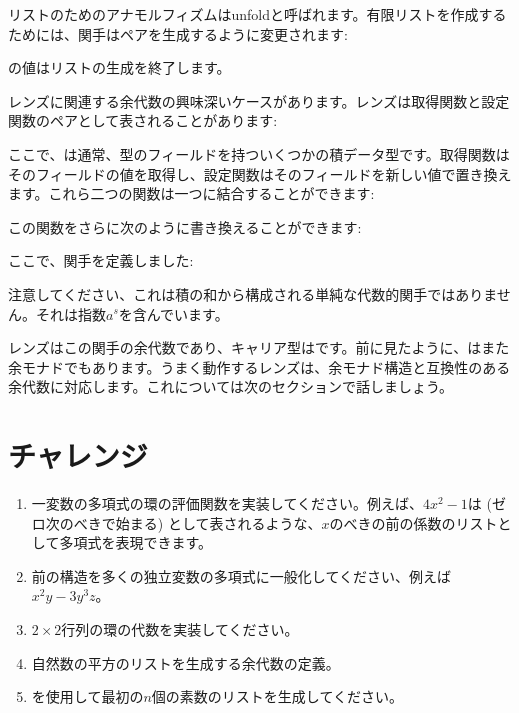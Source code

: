 リストのためのアナモルフィズムはunfoldと呼ばれます。有限リストを作成するためには、関手はペアを生成するように変更されます: 

の値はリストの生成を終了します。

レンズに関連する余代数の興味深いケースがあります。レンズは取得関数と設定関数のペアとして表されることがあります: 

ここで、は通常、型のフィールドを持ついくつかの積データ型です。取得関数はそのフィールドの値を取得し、設定関数はそのフィールドを新しい値で置き換えます。これら二つの関数は一つに結合することができます: 

この関数をさらに次のように書き換えることができます: 

ここで、関手を定義しました: 

注意してください、これは積の和から構成される単純な代数的関手ではありません。それは指数$a^s$を含んでいます。

レンズはこの関手の余代数であり、キャリア型はです。前に見たように、はまた余モナドでもあります。うまく動作するレンズは、余モナド構造と互換性のある余代数に対応します。これについては次のセクションで話しましょう。

\section{チャレンジ}

\begin{enumerate}
  \tightlist
  \item
        一変数の多項式の環の評価関数を実装してください。例えば、$4x^2-1$は (ゼロ次のべきで始まる) \code{{[}-1, 0, 4{]}}として表されるような、$x$のべきの前の係数のリストとして多項式を表現できます。
  \item
        前の構造を多くの独立変数の多項式に一般化してください、例えば$x^2y-3y^3z$。
  \item
        $2\times{}2$行列の環の代数を実装してください。
  \item
        自然数の平方のリストを生成する余代数の定義。
  \item
        を使用して最初の$n$個の素数のリストを生成してください。
\end{enumerate}


